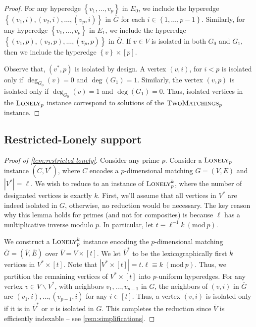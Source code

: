 \documentclass[10pt,a4paper]{article}
\theoremstyle{definition}
\theoremstyle{remark}
\newcommand{\inparen}[1]{\left ( #1 \right )}
\renewcommand{\mod}[1]{~\inparen{\mathrm{mod}~#1}}
\def\set#1{\left\{#1\right\}}
\newcommand{\lonely}{\ensuremath\textsc{Lonely}}
\newcommand{\twoMatchings}{\ensuremath{\textsc{TwoMatchings}}}
\begin{document}
\begin{proof}
For any hyperedge $\set{v_1, \ldots, v_p}$ in $E_0$, we include the hyperedge $\set{(v_1, i), (v_2, i), \ldots, (v_p,i)}$ in $\overline{G}$ for each $i \in \set{1, \ldots, p-1}$. Similarly, for any hyperedge $\set{v_1, \ldots, v_p}$ in $E_1$, we include the hyperedge $\set{(v_1, p), (v_2, p), \ldots, (v_p,p)}$ in $\overline{G}$. If $v \in V$ is isolated in both $G_0$ and $G_1$, then we include the hyperedge $\set{v} \times [p]$.

Observe that, $(v^*, p)$ is isolated by design. A vertex $(v,i)$, for $i < p$ is isolated only if $\deg_{G_0}(v) = 0$ and $\deg(G_1) = 1$. Similarly, the vertex $(v,p)$ is isolated only if $\deg_{G_0}(v) = 1$ and $\deg(G_1) = 0$. Thus, isolated vertices in the $\lonely_p$ instance correspond to solutions of the $\twoMatchings_p$ instance.
\end{proof}

\subsection{Restricted-Lonely support}\label{sec:pmod-equivalence}

\begin{proof}[Proof of \autoref{lem:restricted-lonely}]
Consider any prime $p$. Consider a $\lonely_p$ instance $(C, V^*)$, where $C$ encodes a $p$-dimensional matching $G = (V,E)$ and $|V^*| = \ell$. We wish to reduce to an instance of $\lonely_p^k$, where the number of designated vertices is exactly $k$. First, we'll assume that all vertices in $V^*$ are indeed isolated in $G$, otherwise, no reduction would be necessary. The key reason why this lemma holds for primes (and not for composites) is because $\ell$ has a multiplicative inverse modulo $p$. In particular, let $t \equiv \ell^{-1} k \mod{p}$.

We construct a $\lonely_p^k$ instance encoding the $p$-dimensional matching $\overline{G} = (\overline{V}, \overline{E})$ over $\overline{V} = V \times [t]$. We let $\overline{V}^*$ to be the lexicographically first $k$ vertices in $V^* \times [t]$. Note that $|V^* \times [t]| = t.\ell \equiv k \mod{p}$. Thus, we partition the remaining vertices of $V^* \times [t]$ into $p$-uniform hyperedges. For any vertex $v \in V \smallsetminus V^*$, with neighbors $v_1, \ldots, v_{p-1}$ in $G$, the neighbors of $(v,i)$ in $\overline{G}$ are $(v_1, i), \ldots, (v_{p-1}, i)$ for any $i \in [t]$. Thus, a vertex $(v,i)$ is isolated only if it is in $\overline{V}^*$ or $v$ is isolated in $G$. This completes the reduction since $\overline{V}$ is efficiently indexable -- see \autoref{rem:simplifications}.
\end{proof}
\end{document}
